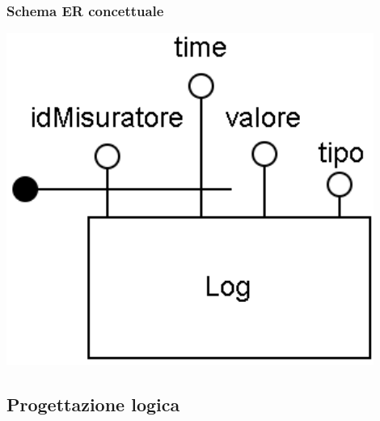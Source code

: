 \subsubsection{Schema ER concettuale}

\begin{center}
    \includegraphics[width=12cm]{contenuti/specifica-basi-dati/img-sbd/logging_concettuale.png}
\end{center}

\subsection{Progettazione logica}